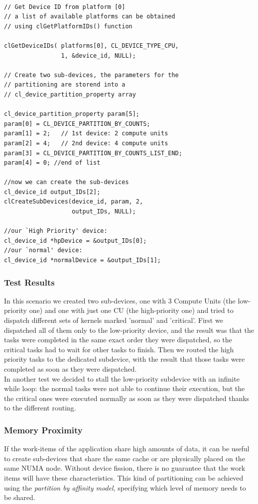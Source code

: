 {\footnotesize\begin{verbatim}

// Get Device ID from platform [0]
// a list of available platforms can be obtained
// using clGetPlatformIDs() function

clGetDeviceIDs( platforms[0], CL_DEVICE_TYPE_CPU,
                1, &device_id, NULL);
								
// Create two sub-devices, the parameters for the
// partitioning are storend into a 
// cl_device_partition_property array

cl_device_partition_property param[5];
param[0] = CL_DEVICE_PARTITION_BY_COUNTS;
param[1] = 2;   // 1st device: 2 compute units
param[2] = 4; 	// 2nd device: 4 compute units
param[3] = CL_DEVICE_PARTITION_BY_COUNTS_LIST_END;
param[4] = 0; //end of list

//now we can create the sub-devices
cl_device_id output_IDs[2]; 
clCreateSubDevices(device_id, param, 2,
                   output_IDs, NULL);
									
//our `High Priority' device:
cl_device_id *hpDevice = &output_IDs[0];  
//our `normal' device:    
cl_device_id *normalDevice = &output_IDs[1]; 

\end{verbatim}}

\subsubsection*{Test Results}
In this scenario we created two sub-devices, one with 3 Compute Units (the low-priority one) and one with just one CU (the high-priority one) and tried to dispatch different sets of kernels marked 'normal' and 'critical'. First we dispatched all of them only to the low-priority device, and the result was that the tasks were completed in the same exact order they were dispatched, so the critical tasks had to wait for other tasks to finish. Then we routed the high priority tasks to the dedicated subdevice, with the result that those tasks were completed as soon as they were dispatched.\\
In another test we decided to stall the low-priority subdevice with an infinite while loop: the normal tasks were not able to continue their execution, but the the critical ones were executed normally as soon as they were dispatched thanks to the different routing.

\subsubsection{Memory Proximity} \label{sect:memproximity}
If the work-items of the application share high amounts of data, it can be useful to create sub-devices that share the same cache or are physically placed on the same NUMA node.
Without device fission, there is no guarantee that the work items will have these characteristics.
This kind of partitioning can be achieved using the \textit{partition by affinity model}, specifying which level of memory needs to be shared.

